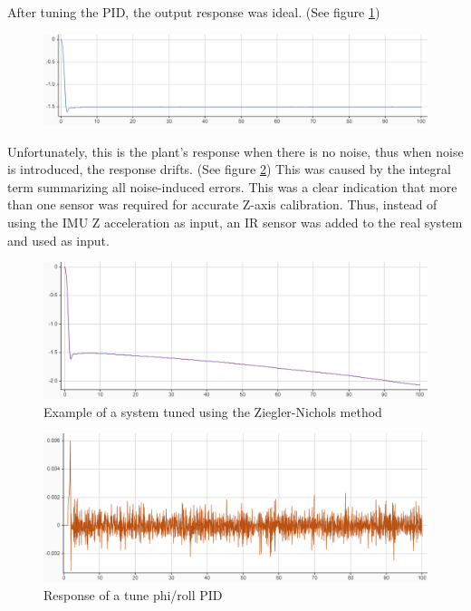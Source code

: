 After tuning the PID, the output response was ideal. (See figure \ref{fig:zpidnonoise})

\begin{figure}[H]
    \begin{center}
    \includegraphics[scale=0.7]{pictures/control/zpidnonoise}
    \end{center}
    \caption{}
    \label{fig:zpidnonoise}
\end{figure}

Unfortunately, this is the plant's response when there is no noise, thus when noise is introduced, the response drifts. (See figure \ref{fig:zpidnoise})
This was caused by the integral term summarizing all noise-induced errors. This was a clear indication that more than one sensor was required for accurate Z-axis calibration.
Thus, instead of using the IMU Z acceleration as input, an IR sensor was added to the real system and used as input.

\begin{figure}[H]
    \begin{center}
    \includegraphics[scale=0.7]{pictures/control/zpidnoise}
    \end{center}
    \caption{Example of a system tuned using the Ziegler-Nichols method\cite{LibrePID}}
    \label{fig:zpidnoise}
\end{figure}



\begin{figure}[H]
    \begin{center}
    \includegraphics[scale=0.7]{pictures/control/phiPID.PNG}
    \end{center}
    \caption{Response of a tune phi/roll PID}
    \label{fig:phipid}
\end{figure}

